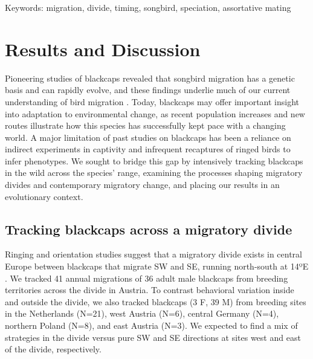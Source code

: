 \documentclass[a4paper, nobind]{templates/ociamthesis}
\begin{document}
Keywords: migration, divide, timing, songbird, speciation, assortative mating

\hypertarget{results-and-discussion}{%
\section{Results and Discussion}\label{results-and-discussion}}

Pioneering studies of blackcaps revealed that songbird migration has a genetic basis and can rapidly evolve, and these findings underlie much of our current understanding of bird migration \autocite{bertholdEvolutionaryAspectsMigratory1988,helbigInheritanceMigratoryDirection1991,bertholdRapidMicroevolutionMigratory1992,bertholdHeritabilityMigratoryActivity1994,helbigGeneticBasisMode1996,pulidoFrequencyMigrantsMigratory1996,pulidoHeritabilityTimingAutumn2001,bearhopAssortativeMatingMechanism2005,pulidoGeneticsEvolutionAvian2007,rolshausenContemporaryEvolutionReproductive2009,pulidoCurrentSelectionLower2010,muellerIdentificationGeneAssociated2011}.
Today, blackcaps may offer important insight into adaptation to environmental change, as recent population increases \autocite{ebcc/birdlife/rspb/csoTrendsCommonBirds2018} and new routes \autocite{bertholdRapidMicroevolutionMigratory1992} illustrate how this species has successfully kept pace with a changing world.
A major limitation of past studies on blackcaps has been a reliance on indirect experiments in captivity \autocite[see Chapter \ref{stonechats};][]{zunigaAbruptSwitchMigratory2016} and infrequent recaptures of ringed birds to infer phenotypes.
We sought to bridge this gap by intensively tracking blackcaps in the wild across the species' range, examining the processes shaping migratory divides and contemporary migratory change, and placing our results in an evolutionary context.

\hypertarget{tracking-blackcaps-across-a-migratory-divide}{%
\subsection{Tracking blackcaps across a migratory divide}\label{tracking-blackcaps-across-a-migratory-divide}}

Ringing and orientation studies suggest that a migratory divide exists in central Europe between blackcaps that migrate SW and SE, running north-south at 14ºE \autocite{helbigPopulationDifferentiationMigratory1992,helbigSESWmigratingBlackcap1991}. We tracked 41 annual migrations of 36 adult male blackcaps from breeding territories across the divide in Austria. To contrast behavioral variation inside and outside the divide, we also tracked blackcaps (3 F, 39 M) from breeding sites in the Netherlands (N=21), west Austria (N=6), central Germany (N=4), northern Poland (N=8), and east Austria (N=3). We expected to find a mix of strategies in the divide versus pure SW and SE directions at sites west and east of the divide, respectively.
\end{document}
